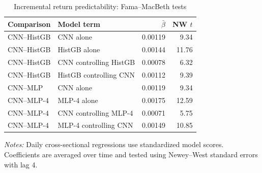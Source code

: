 \begin{table}[htbp]
\centering
\caption{Incremental return predictability: Fama--MacBeth tests}
\label{tab:complementarity_fm}
\begin{tabular}{llrr}
\toprule
Comparison & Model term & $\bar{\beta}$ & NW $t$ \\
\midrule
CNN--HistGB & CNN alone & 0.00119 & 9.34 \\
CNN--HistGB & HistGB alone & 0.00144 & 11.76 \\
CNN--HistGB & CNN controlling HistGB & 0.00078 & 6.32 \\
CNN--HistGB & HistGB controlling CNN & 0.00112 & 9.39 \\
\midrule
CNN--MLP & CNN alone & 0.00119 & 9.34 \\
CNN--MLP-4 & MLP-4 alone & 0.00175 & 12.59 \\
CNN--MLP-4 & CNN controlling MLP-4 & 0.00071 & 5.75 \\
CNN--MLP-4 & MLP-4 controlling CNN & 0.00149 & 10.85 \\
\bottomrule
\end{tabular}
\begin{minipage}{0.92\linewidth}
\footnotesize
\textit{Notes:} Daily cross-sectional regressions use standardized model scores. Coefficients are averaged over time and tested using Newey--West standard errors with lag 4.
\end{minipage}
\end{table}
